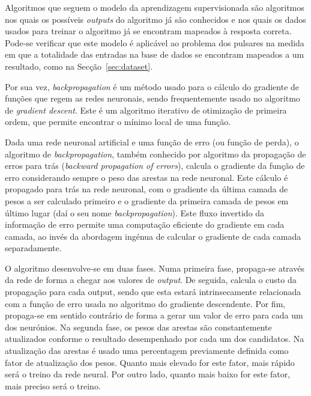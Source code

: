 \documentclass[]{article}
\begin{document}
    Algoritmos que seguem o modelo da aprendizagem supervisionada são algoritmos nos quais os possíveis \textit{outputs} do algoritmo já são conhecidos e nos quais os dados usados para treinar o algoritmo já se encontram mapeados à resposta correta. Pode-se verificar que este modelo é aplicável ao problema dos pulsares na medida em que a totalidade das entradas na base de dados se encontram mapeados a um resultado, como na Secção~\ref{sec:dataset}.
    
    Por sua vez, \textit{backpropagation} é um método usado para o cálculo do gradiente de funções que regem as redes neuronais, sendo frequentemente usado no algoritmo de \textit{gradient descent}. Este é um algoritmo iterativo de otimização de primeira ordem, que permite encontrar o mínimo local de uma função.
    
	Dada uma rede neuronal artificial e uma função de erro (ou função de perda), o algoritmo de \textit{backpropagation}, também conhecido por algoritmo da propagação de erros para trás (\textit{backward propagation of errors}), calcula o gradiente da função de erro considerando sempre o peso das arestas na rede neuronal. Este cálculo é propagado para trás na rede neuronal, com o gradiente da última camada de pesos a ser calculado primeiro e o gradiente da primeira camada de pesos em último lugar (daí o seu nome \textit{backpropagation}). Este fluxo invertido da informação de erro permite uma computação eficiente do gradiente em cada camada, ao invés da abordagem ingénua de calcular o gradiente de cada camada separadamente.
    
    O algoritmo desenvolve-se em duas fases. Numa primeira fase, propaga-se através da rede de forma a chegar aos valores de \textit{output}. De seguida, calcula o custo da propagação para cada output, sendo que esta estará intrinsecamente relacionada com a função de erro usada no algoritmo do gradiente descendente. Por fim, propaga-se em sentido contrário de forma a gerar um valor de erro para cada um dos neurónios. Na segunda fase, os pesos das arestas são constantemente atualizados conforme o resultado desempenhado por cada um dos candidatos. Na atualização das arestas é usado uma percentagem previamente definida como fator de atualização dos pesos. Quanto mais elevado for este fator, mais rápido será o treino da rede neural. Por outro lado, quanto mais baixo for este fator, mais preciso será o treino.
    
    
\end{document}
